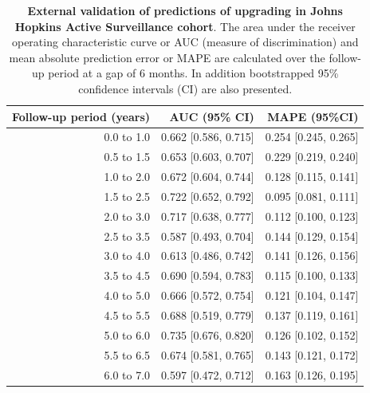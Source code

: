 \begin{table}[!htb]
\small\sf\centering
\caption{\textbf{External validation of predictions of upgrading in Johns Hopkins Active Surveillance cohort}. The area under the receiver operating characteristic curve or AUC (measure of discrimination) and mean absolute prediction error or MAPE are calculated over the follow-up period at a gap of 6 months. In addition bootstrapped 95\% confidence intervals (CI) are also presented.}
\label{tab:AUC_PE_Hopkins}
\begin{tabular}{r|r|r}
\hline
\hline
Follow-up period (years) & AUC (95\% CI) & MAPE (95\%CI)\\ 
\hline
0.0 to 1.0 & 0.662 [0.586, 0.715] & 0.254 [0.245, 0.265]\\
0.5 to 1.5 & 0.653 [0.603, 0.707] & 0.229 [0.219, 0.240]\\
1.0 to 2.0 & 0.672 [0.604, 0.744] & 0.128 [0.115, 0.141]\\
1.5 to 2.5 & 0.722 [0.652, 0.792] & 0.095 [0.081, 0.111]\\
2.0 to 3.0 & 0.717 [0.638, 0.777] & 0.112 [0.100, 0.123]\\
2.5 to 3.5 & 0.587 [0.493, 0.704] & 0.144 [0.129, 0.154]\\
3.0 to 4.0 & 0.613 [0.486, 0.742] & 0.141 [0.126, 0.156]\\
3.5 to 4.5 & 0.690 [0.594, 0.783] & 0.115 [0.100, 0.133]\\
4.0 to 5.0 & 0.666 [0.572, 0.754] & 0.121 [0.104, 0.147]\\
4.5 to 5.5 & 0.688 [0.519, 0.779] & 0.137 [0.119, 0.161]\\
5.0 to 6.0 & 0.735 [0.676, 0.820] & 0.126 [0.102, 0.152]\\
5.5 to 6.5 & 0.674 [0.581, 0.765] & 0.143 [0.121, 0.172]\\
6.0 to 7.0 & 0.597 [0.472, 0.712] & 0.163 [0.126, 0.195]\\
\hline
\end{tabular}    
\end{table}

